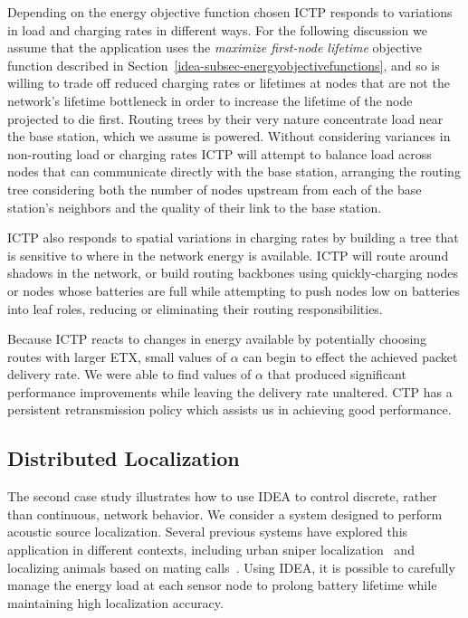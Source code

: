 Depending on the energy objective function chosen ICTP responds to variations
in load and charging rates in different ways. For the following discussion we
assume that the application uses the \textit{maximize first-node lifetime}
objective function described in
Section~\ref{idea-subsec-energyobjectivefunctions}, and so is willing to
trade off reduced charging rates or lifetimes at nodes that are not the
network's lifetime bottleneck in order to increase the lifetime of the node
projected to die first. Routing trees by their very nature concentrate load
near the base station, which we assume is powered. Without considering
variances in non-routing load or charging rates ICTP will attempt to balance
load across nodes that can communicate directly with the base station,
arranging the routing tree considering both the number of nodes upstream from
each of the base station's neighbors and the quality of their link to the
base station.

ICTP also responds to spatial variations in charging rates by building a tree
that is sensitive to where in the network energy is available. ICTP will
route around shadows in the network, or build routing backbones using
quickly-charging nodes or nodes whose batteries are full while attempting to
push nodes low on batteries into leaf roles, reducing or eliminating their
routing responsibilities.

Because ICTP reacts to changes in energy available by potentially choosing
routes with larger ETX, small values of $\alpha$ can begin to effect the
achieved packet delivery rate. We were able to find values of $\alpha$ that
produced significant performance improvements while leaving the delivery rate
unaltered. CTP has a persistent retransmission policy which assists us in
achieving good performance.

\subsection{Distributed Localization}

The second case study illustrates how to use IDEA to control discrete, rather
than continuous, network behavior. We consider a system designed to perform
acoustic source localization. Several previous systems have explored this
application in different contexts, including urban sniper
localization~\cite{shooter-localization} and localizing animals based on
mating calls~\cite{girod-marmots}. Using IDEA, it is possible to carefully
manage the energy load at each sensor node to prolong battery lifetime while
maintaining high localization accuracy.

